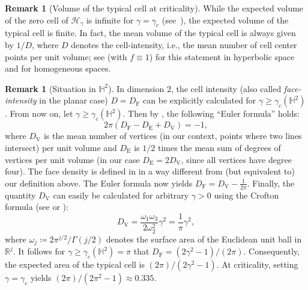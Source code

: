 \documentclass[12pt,a4paper]{article}
\theoremstyle{definition}
\newtheorem{remark}[proposition]{Remark}
\renewcommand{\H}{\mathbb{H}}
\newcommand{\R}{\mathbb{R}}
\begin{document}
\begin{remark}[Volume of the typical cell at criticality]
    While the expected volume of the zero cell of $\mathcal{H}_{\gamma}$ is infinite for $\gamma=\gamma_c$ (see~\cite[Theorem~7.1]{BHT25}), the expected volume of the typical cell is finite.
    In fact, the mean volume of the typical cell is always given by $1/D$, where $D$ denotes the cell-intensity, i.e., the mean number of cell center points per unit volume;
    see \cite[Theorem 5.4.3]{Herold2021} (with $f\equiv 1$) for this statement in hyperbolic space and \cite[Equation (8.11)]{Last10} for homogeneous spaces.
\end{remark}
\begin{remark}[Situation in $\H^2$]
    In dimension $2$, the cell intensity (also called \emph{face-intensity} in the planar case) $D = D_\text{F}$ can be explicitly calculated for $\gamma \geq \gamma_c(\H^2)$.
    From now on, let $\gamma \geq \gamma_c(\H^2)$.
    Then by \cite[Theorem 5.5]{BS01}, the following ``Euler formula'' holds:
    \begin{equation*}
        2\pi (D_\text{F} - D_\text{E} + D_\text{V}) = -1,
    \end{equation*}
    where $D_\text{V}$ is the mean number of vertices (in our context, points where two lines intersect) per unit volume and $D_\text{E}$ is $1/2$ times the mean sum of degrees of vertices per unit volume (in our case $D_\text{E} = 2 D_\text{V}$, since all vertices have degree four).
    The face density is defined in \cite{BS01} in a way different from (but equivalent to) our definition above.
    The Euler formula now yields $D_\text{F} = D_\text{V} - \frac{1}{2\pi}$.
    Finally, the quantity $D_\text{V}$ can easily be calculated for arbitrary $\gamma > 0$ using the Crofton formula (see \cite[Theorem 1]{HHT21} or \cite[Equation (1.4)]{BHT23}):
    \[ D_\text{V} = \frac{\omega_1\omega_3}{2\omega_2^2} \gamma^2 = \frac{1}{\pi} \gamma^2, \]
    where $\omega_j \coloneqq 2\pi^{j/2}/\Gamma(j/2) $ denotes the surface area of the Euclidean unit ball in $\R^j$.
    It follows for $\gamma \geq \gamma_c(\H^2) = \pi$ that $D_\text{F} = (2\gamma^2 - 1)/(2\pi)$.
    Consequently, the expected area of the typical cell is $(2\pi)/(2\gamma^2-1)$.
    At criticality, setting $\gamma = \gamma_c$ yields $(2\pi)/(2\pi^2-1) \approx 0.335$.
\end{remark}

\medskip
\end{document}
